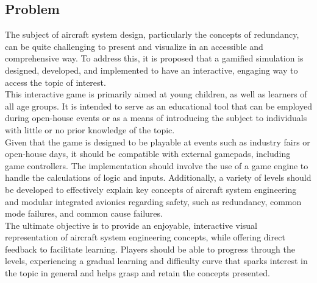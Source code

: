 \subsection{Problem}\label{subsec:problem}
The subject of aircraft system design, particularly the concepts of redundancy, can be quite challenging to present and visualize
in an accessible and comprehensive way.
To address this, it is proposed that a gamified simulation is designed, developed, and implemented to have an interactive, engaging way to access the topic of interest.
\\
This interactive game is primarily aimed at young children, as well as learners of all age groups.
It is intended to serve as an educational tool that can be employed during open-house events or as a means of
introducing the subject to individuals with little or no prior knowledge of the topic.
\\
Given that the game is designed to be playable at events such as industry fairs or open-house days,
it should be compatible with external gamepads, including game controllers.
The implementation should involve the use of a game engine to handle the calculations of logic and inputs.
Additionally, a variety of levels should be developed to effectively explain key concepts of aircraft system engineering and
modular integrated avionics regarding safety, such as redundancy, common mode failures, and common cause failures.
\\
The ultimate objective is to provide an enjoyable, interactive visual representation of aircraft system engineering concepts,
while offering direct feedback to facilitate learning.
Players should be able to progress through the levels, experiencing a gradual learning and difficulty curve that sparks interest in the topic
in general and helps grasp and retain the concepts presented.

